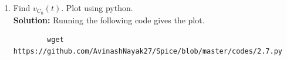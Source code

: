 \documentclass[journal,12pt,twocolumn]{IEEEtran}
\newcommand{\solution}{\noindent \textbf{Solution: }}
\providecommand{\brak}[1]{\ensuremath{\left(#1\right)}}
\providecommand{\system}[1]{\overset{\mathcal{#1}}{ \longleftrightarrow}}
\numberwithin{equation}{section}
\renewcommand\thesection{\arabic{section}}
\begin{document}
\begin{enumerate}[label=\arabic*.,ref=\thesection.\theenumi]
\begin{figure}[!ht]
			\caption{}
			\label{fig:lap-ckt}
\end{figure}
		where 
		\begin{align}
			u(t) \system{L} V_1(s)
			\\
			2u(t) \system{L} V_2(s)
		\end{align}
		Find the voltage across the capacitor $V_{C_0}(s)$.\\
		\solution
		\begin{align}
		R_{eff}=\frac{1}{1+\frac{1}{2}}
		=\frac{2}{3} \Omega\\
		V_{eff}=\frac{1}{1+\frac{1}{2}}
		=\frac{2}{3}V
		\end{align}
\begin{align}
V_{C_0}(s)&=V_{S}(s)\frac{C_{0}}{C_{0}+R_{eff}}\\
&=\brak{\frac{4}{3s}}\brak{\frac{\frac{1}{s}}{\frac{1}{s}+\frac{2}{3}}}\\
\label{eq:laptr}
&=\frac{3+4s}{3s\brak{s+\frac{3}{2}}}
\end{align}
	\item Find $v_{C_0}(t)$.  Plot using python.\\
	\solution Running the following code gives the plot.
	\begin{lstlisting}
		wget https://github.com/AvinashNayak27/Spice/blob/master/codes/2.7.py
	\end{lstlisting}
	

\end{enumerate}
\end{document}

